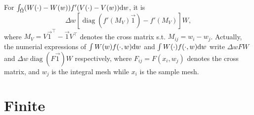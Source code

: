 \documentclass{article}
\begin{document}
  For $\int_{\tilde\Omega}(W(\cdot) - W(w))f'(V(\cdot) - V(w))\mathrm d w$, it is
  \[
    \Delta w\left[\operatorname{diag}\left(f'(M_V)\vec 1\right) - f'(M_V)\right]W,
  \]
  where $M_V = V\vec 1^\top - \vec 1 V^\top$ denotes the cross matrix s.t. $M_{ij} = w_i - w_j$.
  Actually, the numerial expressions of $\int W(w)f(\cdot, w)\mathrm d w$ and $\int W(\cdot)f(\cdot, w)\mathrm d w$
  write $\Delta w FW$ and $\Delta w\operatorname{diag}(F\vec 1)W$ respectively,
  where $F_{ij} = F(x_i, w_j)$ denotes the cross matrix, and $w_j$ is the integral mesh while $x_i$ is
  the sample mesh.

  \section{Finite}
\end{document}
